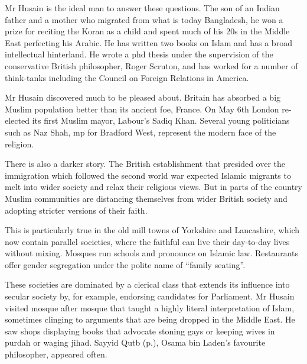 Mr Husain is the ideal man to answer these questions. The son of an Indian father and a mother who migrated from what is today Bangladesh, he won a prize for reciting the Koran as a child and spent much of his 20s in the Middle East perfecting his Arabic. He has written two books on Islam and has a broad intellectual hinterland. He wrote a phd thesis under the supervision of the conservative British philosopher, Roger Scruton, and has worked for a number of think-tanks including the Council on Foreign Relations in America.


Mr Husain discovered much to be pleased about. Britain has absorbed a big Muslim population better than its ancient foe, France. On May 6th London re-elected its first Muslim mayor, Labour’s Sadiq Khan. Several young politicians such as Naz Shah, mp for Bradford West, represent the modern face of the religion.

There is also a darker story. The British establishment that presided over the immigration which followed the second world war expected Islamic migrants to melt into wider society and relax their religious views. But in parts of the country Muslim communities are distancing themselves from wider British society and adopting stricter versions of their faith.

This is particularly true in the old mill towns of Yorkshire and Lancashire, which now contain parallel societies, where the faithful can live their day-to-day lives without mixing. Mosques run schools and pronounce on Islamic law. Restaurants offer gender segregation under the polite name of “family seating”.

These societies are dominated by a clerical class that extends its influence into secular society by, for example, endorsing candidates for Parliament. Mr Husain visited mosque after mosque that taught a highly literal interpretation of Islam, sometimes clinging to arguments that are being dropped in the Middle East. He saw shops displaying books that advocate stoning gays or keeping wives in purdah or waging jihad. Sayyid Qutb (p.\pageref{theol:SayyidQutb}), Osama bin Laden’s favourite philosopher, appeared often.

